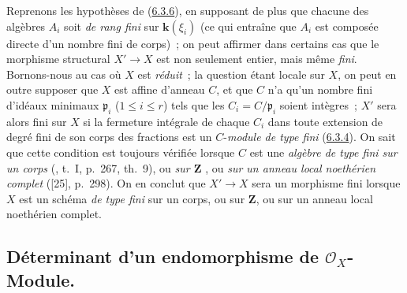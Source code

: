\begin{remark}[6.3.10]
\label{II.6.3.10-fr}
Reprenons les hypothèses de (\hyperref[II.6.3.6-fr]{6.3.6}), en supposant de
plus que chacune des algèbres $A_i$ soit \emph{de rang fini} sur $\boldsymbol{k}(\xi_i)$
(ce qui entraîne que $A_i$ est composée directe d'un nombre fini de corps)~;
on peut affirmer dans certains cas que le morphisme structural $X'\to X$ est
non seulement entier, mais même \emph{fini}. Bornons-nous au cas où $X$ est
\emph{réduit}~; la question étant locale sur $X$, on peut en outre supposer
que $X$ est affine d'anneau $C$, et que $C$ n'a qu'un nombre fini d'idéaux
minimaux $\mathfrak{p}_i$ ($1\leq i\leq r$) tels que les
$C_i=C/\mathfrak{p}_i$ soient intègres~; $X'$ sera alors fini sur $X$ si la
fermeture intégrale de chaque $C_i$ dans toute extension de degré fini de son
corps des fractions est un $C$-\emph{module de type fini}
(\hyperref[II.6.3.4-fr]{6.3.4}). On sait que cette condition est toujours
vérifiée lorsque $C$ est une \emph{algèbre de type fini sur un corps}
(\cite{I-13}, t.~I, p.~267, th.~9), ou \emph{sur $\mathbf{Z}$}
\cite[I, p.~93, th.~3]{I-9}, ou \emph{sur un anneau local noethérien
complet} ([25], p.~298). On en conclut que $X'\to X$ sera un morphisme
fini lorsque $X$ est un schéma \emph{de type fini} sur un corps, ou sur
$\mathbf{Z}$, ou sur un anneau local noethérien complet.
\end{remark}

\subsection{Déterminant d'un endomorphisme de $\mathcal{O}_X$-Module.}
\label{subsection:II.6.4-fr}

